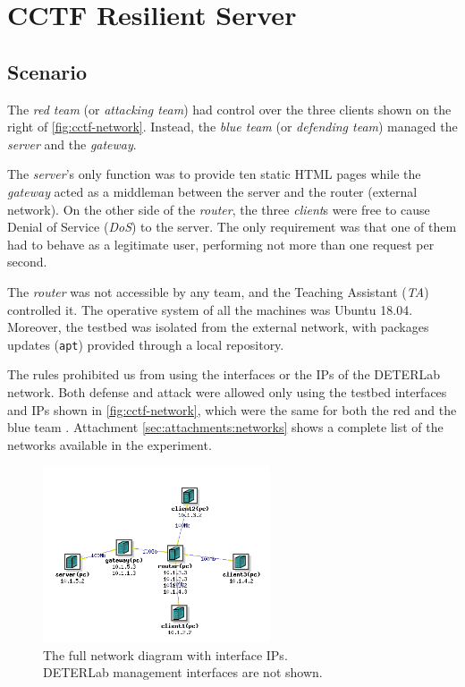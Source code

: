 \section{CCTF Resilient Server}
\label{sec:cctf-resilient}

\subsection{Scenario}
\label{sec:cctf-resilient:scenario}


The \textit{red team} (or \textit{attacking team}) had control over the three clients shown on the right of \autoref{fig:cctf-network}. Instead, the \textit{blue team} (or \textit{defending team}) managed the \textit{server} and the \textit{gateway}.

The \textit{server}'s only function was to provide ten static HTML pages while the \textit{gateway} acted as a middleman between the server and the router (external network). 
On the other side of the \textit{router}, the three \textit{client}s were free to cause Denial of Service (\textit{DoS}) to the server. The only requirement was that one of them had to behave as a legitimate user, performing not more than one request per second.

The \textit{router} was not accessible by any team, and the Teaching Assistant (\textit{TA}) controlled it. The operative system of all the machines was Ubuntu 18.04. Moreover, the testbed was isolated from the external network, with packages updates (\texttt{apt}) provided through a local repository.

The rules prohibited us from using the interfaces or the IPs of the DETERLab network. Both defense and attack were allowed only using the testbed interfaces and IPs shown in \autoref{fig:cctf-network}, which were the same for both the red and the blue team  \cite{resilient-server}. Attachment \ref{sec:attachments:networks} shows a complete list of the networks available in the experiment.

\begin{figure}[ht]
    \centering
    \includegraphics[width=0.6\textwidth]{drawable/network.png}
    \captionsetup{justification=centering}
    \caption{The full network diagram with interface IPs.\\DETERLab management interfaces are not shown.}
    \label{fig:cctf-network}
\end{figure}

